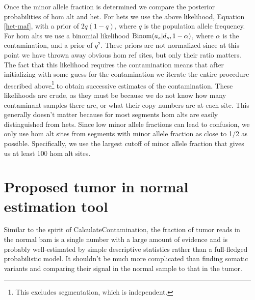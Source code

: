 \documentclass[nofootinbib,amssymb,amsmath]{revtex4}
\begin{document}
Once the minor allele fraction is determined we compare the posterior probabilities of hom alt and het.  For hets we use the above likelihood, Equation \ref{het-maf}, with a prior of $2 q (1 - q)$, where $q$ is the population allele frequency.  For hom alts we use a binomial likelihood ${\rm Binom}(a_s | d_s, 1 - \alpha)$, where $\alpha$ is the contamination, and a prior of $q^2$.  These priors are not normalized since at this point we have thrown away obvious hom ref sites, but only their ratio matters.  The fact that this likelihood requires the contamination means that after initializing with some guess for the contamination we iterate the entire procedure described above\footnote{This excludes segmentation, which is independent.} to obtain successive estimates of the contamination.  These likelihoods are crude, as they must be because we do not know how many contaminant samples there are, or what their copy numbers are at each site.  This generally doesn't matter because for most segments hom alts are easily distinguished from hets.  Since low minor allele fractions can lead to confusion, we only use hom alt sites from segments with minor allele fraction as close to 1/2 as possible.  Specifically, we use the largest cutoff of minor allele fraction that gives us at least 100 hom alt sites.



\section{Proposed tumor in normal estimation tool}
Similar to the spirit of CalculateContamination, the fraction of tumor reads in the normal bam is a single number with a large amount of evidence and is probably well-estimated by simple descriptive statistics rather than a full-fledged probabilistic model.  It shouldn't be much more complicated than finding somatic variants and comparing their signal in the normal sample to that in the tumor.
\end{document}
